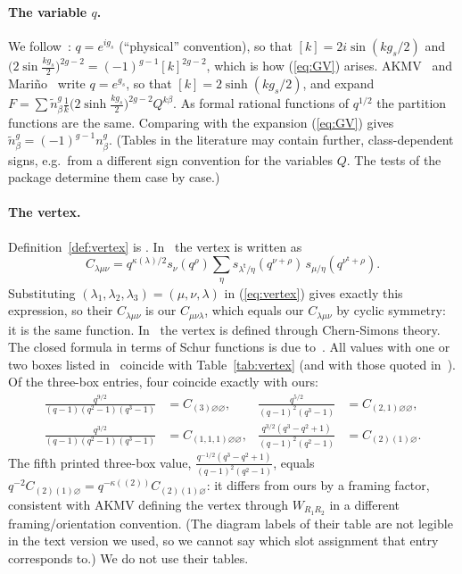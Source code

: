 \documentclass[11pt]{article}
\theoremstyle{plain}
\theoremstyle{definition}
\theoremstyle{remark}
\newcommand{\qrho}{q^{\rho}}
\newcommand{\es}{\varnothing}
\newcommand{\tr}{{\mathsf t}}
\newcommand{\lt}[1]{#1^{\tr}}
\begin{document}
\paragraph{The variable $q$.} We follow~\cite{Kon}: $q=e^{ig_s}$ (``physical'' convention), so
that $[k]=2i\sin(kg_s/2)$ and $\big(2\sin\frac{kg_s}2\big)^{2g-2}=(-1)^{g-1}[k]^{2g-2}$, which
is how (\ref{eq:GV}) arises. AKMV~\cite{AKMV} and Mari\~no~\cite{Marino} write $q=e^{g_s}$, so that
$[k]=2\sinh(kg_s/2)$, and expand
$F=\sum\tilde n^g_\beta\frac1k\big(2\sinh\frac{kg_s}2\big)^{2g-2}Q^{k\beta}$. As formal rational
functions of $q^{1/2}$ the partition functions are the same. Comparing with the expansion
(\ref{eq:GV}) gives
$\tilde n^g_\beta=(-1)^{g-1}n^g_\beta$. (Tables in the literature may contain further, class-dependent signs, e.g.\ from a different
sign convention for the variables $Q$. The tests of the package determine them case by case.)

\paragraph{The vertex.} Definition~\ref{def:vertex} is \cite[Def.~2.2]{Kon}. In~\cite[(7)]{IKP-strip}
the vertex is written as
\begin{equation}
C_{\lambda\mu\nu}=q^{\kappa(\lambda)/2}s_\nu(\qrho)\sum_\eta s_{\lt\lambda/\eta}(q^{\nu+\rho})\,
s_{\mu/\eta}(q^{\lt\nu+\rho}).
\end{equation}
Substituting $(\lambda_1,\lambda_2,\lambda_3)=(\mu,\nu,\lambda)$ in (\ref{eq:vertex}) gives exactly
this expression, so their $C_{\lambda\mu\nu}$ is our $C_{\mu\nu\lambda}$, which equals our
$C_{\lambda\mu\nu}$ by cyclic symmetry: it is the same function. In~\cite{AKMV} the vertex is defined
through Chern-Simons theory. The closed formula in terms of Schur functions is due to~\cite{ORV}. All values with
one or two boxes listed in~\cite[\S8]{AKMV} coincide with Table~\ref{tab:vertex} (and with those
quoted in~\cite[p.~6]{Kon}). Of the three-box entries, four coincide exactly with ours:
\begin{align}
\frac{q^{9/2}}{(q-1)(q^2-1)(q^3-1)}&=C_{(3)\es\es}, &
\frac{q^{5/2}}{(q-1)^2(q^3-1)}&=C_{(2,1)\es\es},\\
\frac{q^{3/2}}{(q-1)(q^2-1)(q^3-1)}&=C_{(1,1,1)\es\es}, &
\frac{q^{3/2}(q^3-q^2+1)}{(q-1)^2(q^2-1)}&=C_{(2)(1)\es}.
\end{align}
The fifth printed three-box value, $\frac{q^{-1/2}(q^3-q^2+1)}{(q-1)^2(q^2-1)}$, equals
$q^{-2}C_{(2)(1)\es}=q^{-\kappa((2))}C_{(2)(1)\es}$: it differs from ours by a framing factor,
consistent with AKMV defining the vertex through $W_{R_1R_2}$ in a different framing/orientation
convention. (The diagram labels of their table are not legible in the text version we used, so
we cannot say which slot assignment that entry corresponds to.) We do not use their tables.
\end{document}
